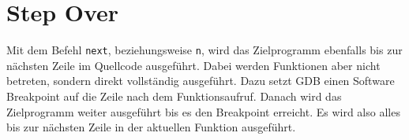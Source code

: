 \section{Step Over}
Mit dem Befehl \texttt{next}, beziehungsweise \texttt{n}, wird das Zielprogramm ebenfalls bis zur nächsten Zeile im Quellcode ausgeführt. Dabei werden Funktionen aber nicht betreten, sondern direkt vollständig ausgeführt. Dazu setzt GDB einen Software Breakpoint auf die Zeile nach dem Funktionsaufruf. Danach wird das Zielprogramm weiter ausgeführt bis es den Breakpoint erreicht. Es wird also alles bis zur nächsten Zeile in der aktuellen Funktion ausgeführt.